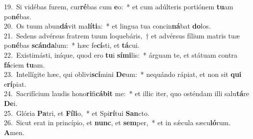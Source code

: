 {19.~}Si vidébas furem, cur\textbf{ré}bas cum \textbf{e}o:~* et cum adúlteris portiónem \textbf{tu}am po\textbf{né}bas.\\
{20.~}Os tuum abun\textbf{dá}vit ma\textbf{lí}\textbf{ti}a:~* et lingua tua concin\textbf{ná}bat \textbf{do}los.\\
{21.~}Sedens advérsus fratrem tuum loquebáris,~† et advérsus fílium matris tuæ po\textbf{né}bas \textbf{scán}\textbf{da}lum:~* hæc fe\textbf{cí}sti, et \textbf{tá}cui.\\
{22.~}Existimásti, iníque, quod ero \textbf{tu}i \textbf{sí}\textbf{mi}lis:~* árguam te, et státuam contra \textbf{fá}ciem \textbf{tu}am.\\
{23.~}Intellígite hæc, qui oblivi\textbf{scí}mini \textbf{De}um:~* nequándo rápiat, et non sit \textbf{qui} e\textbf{rí}piat.\\
{24.~}Sacrifícium laudis hono\textbf{ri}fi\textbf{cá}\textbf{bit} me:~* et illic iter, quo osténdam illi salu\textbf{tá}re \textbf{De}i.\\
{25.~}Glória \textbf{Pa}tri, et \textbf{Fí}\textbf{li}o,~* et Spi\textbf{rí}tui \textbf{San}cto.\\
{26.~}Sicut erat in princípio, et \textbf{nunc}, et \textbf{sem}per,~* et in sǽcula sæcu\textbf{ló}rum. \textbf{A}men.\\
